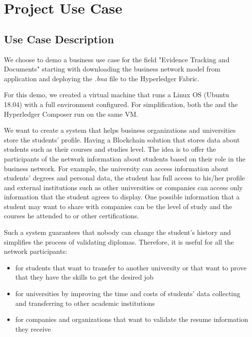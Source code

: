 \chapter{Project Use Case}
\label{chapter:chapter4}

\section{Use Case Description}
\label{sub-sec:chapter4-section1}
We choose to demo a business use case for the field "Evidence Tracking and Documents" starting with downloading the business network model from \project application and deploying the \emph{.bna} file to the Hyperledger Fabric.

For this demo, we created a virtual machine that runs a Linux OS (Ubuntu 18.04) with a full environment configured. For simplification, both the \project and the Hyperledger Composer run on the same VM. 

We want to create a system that helps business organizations and universities store the students' profile. Having a Blockchain solution that stores data about students such as their courses and studies level.
The idea is to offer the participants of the network information about students based on their role in the business network.
For example, the university can access information about students' degrees and personal data, the student has full access to his/her profile and external institutions such as other universities or companies can access only information that the student agrees to display. One possible information that a student may want to share with companies can be the level of study and the courses he attended to or other certifications.

Such a system guarantees that nobody can change the student's history and simplifies the process of validating diplomas. 
Therefore, it is useful for all the network participants:
\begin{itemize}
	\item for students that want to transfer to another university or that want to prove that they have the skills to get the desired job
	\item for universities by improving the time and costs of students' data collecting and transferring to other academic institutions
	\item for companies and organizations that want to validate the resume information they receive
\end{itemize}

